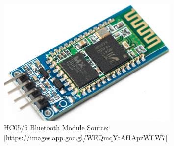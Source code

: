 \documentclass[12pt,a4paper]{report}
\begin{document}
\begin{figure}[H]
    \centering
    \includegraphics[width=0.8\textwidth]{img/HC05-HC06 Bluetooth Module.png}
    \caption{HC05/6 Bluetooth Module Source:[https://images.app.goo.gl/WEQmqYtAf1ApzWFW7]}
\end{figure}
\end{document}

